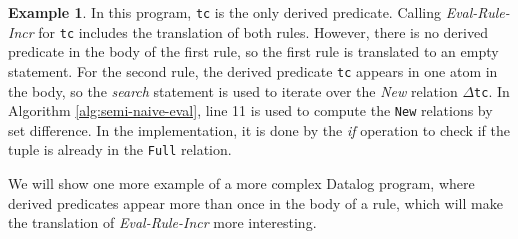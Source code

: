 \documentclass[twoside,11pt,openright]{report}
\theoremstyle{definition}
\newtheorem{exmp}{Example}[chapter]
\begin{document}
\begin{exmp}
  In this program, \texttt{tc} is the only derived predicate. Calling \textit{Eval-Rule-Incr} for \texttt{tc} includes the translation of both rules. However, there is no derived predicate in the body of the first rule, so the first rule is translated to an empty statement. For the second rule, the derived predicate \texttt{tc} appears in one atom in the body, so the \textit{search} statement is used to iterate over the \textit{New} relation $\Delta$\texttt{tc}. In Algorithm \ref{alg:semi-naive-eval}, line 11 is used to compute the \texttt{New} relations by set difference. In the implementation, it is done by the \textit{if} operation to check if the tuple is already in the \texttt{Full} relation.
\end{exmp}
\label{exmp:tc-ram}

We will show one more example of a more complex Datalog program, where derived predicates appear more than once in the body of a rule, which will make the translation of \textit{Eval-Rule-Incr} more interesting.
\end{document}
